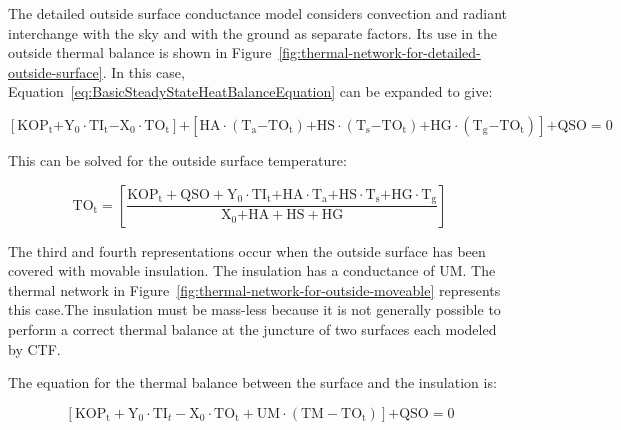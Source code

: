 The detailed outside surface conductance model considers convection and radiant interchange with the sky and with the ground as separate factors. Its use in the outside thermal balance is shown in Figure~\ref{fig:thermal-network-for-detailed-outside-surface}. In this case, Equation~\ref{eq:BasicSteadyStateHeatBalanceEquation} can be expanded to give:

\begin{equation}
\left[ {{\mathrm{KO}}{{\mathrm{P}}_{\mathrm{t}}}{\mathrm{ + }}{{\mathrm{Y}}_{\mathrm{0}}}\cdot {\mathrm{T}}{{\mathrm{I}}_{\mathrm{t}}}{\mathrm{ - }}{{\mathrm{X}}_{\mathrm{0}}}\cdot {\mathrm{T}}{{\mathrm{O}}_{\mathrm{t}}}} \right]{\mathrm{ + }}\left[ {{\mathrm{HA}}\cdot \left( {{{\mathrm{T}}_{\mathrm{a}}}{\mathrm{ - T}}{{\mathrm{O}}_{\mathrm{t}}}} \right){\mathrm{ + HS}}\cdot \left( {{{\mathrm{T}}_{\mathrm{s}}}{\mathrm{ - T}}{{\mathrm{O}}_{\mathrm{t}}}} \right){\mathrm{ + HG}}\cdot \left( {{{\mathrm{T}}_{\mathrm{g}}}{\mathrm{ - T}}{{\mathrm{O}}_{\mathrm{t}}}} \right)} \right]{\mathrm{  + QSO  =  0  }}
\label{eq:MoreDetailedOutsideSurfHeatBalEq}
\end{equation}

This can be solved for the outside surface temperature:

\begin{equation}
{\mathrm{T}}{{\mathrm{O}}_{\mathrm{t}}}{\mathrm{ = }}\left[ {\frac{{{\mathrm{KO}}{{\mathrm{P}}_{\mathrm{t}}} + {\mathrm{QSO}} + {{\mathrm{Y}}_0}\cdot {\mathrm{T}}{{\mathrm{I}}_{\mathrm{t}}}{\mathrm{ + HA}}\cdot {{\mathrm{T}}_{\mathrm{a}}}{\mathrm{ + HS}}\cdot {{\mathrm{T}}_{\mathrm{s}}}{\mathrm{ + HG}}\cdot {{\mathrm{T}}_{\mathrm{g}}}}}{{{{\mathrm{X}}_{\mathrm{0}}}{\mathrm{ + HA + HS + HG}}}}} \right]{\mathrm{  }}
\end{equation}

The third and fourth representations occur when the outside surface has been covered with movable insulation. The insulation has a conductance of UM. The thermal network in Figure~\ref{fig:thermal-network-for-outside-moveable} represents this case.The insulation must be mass-less because it is not generally possible to perform a correct thermal balance at the juncture of two surfaces each modeled by CTF.

The equation for the thermal balance between the surface and the insulation is:

\begin{equation}
\left[ {{\mathrm{KO}}{{\mathrm{P}}_{\mathrm{t}}} + {{\mathrm{Y}}_{\mathrm{0}}}\cdot {\mathrm{T}}{{\mathrm{I}}_t} - {{\mathrm{X}}_{\mathrm{0}}}\cdot {\mathrm{T}}{{\mathrm{O}}_{\mathrm{t}}} + {\mathrm{UM}}\cdot \left( {{\mathrm{TM - T}}{{\mathrm{O}}_{\mathrm{t}}}} \right)} \right]{\mathrm{ + QSO  =  0}}
\end{equation}

